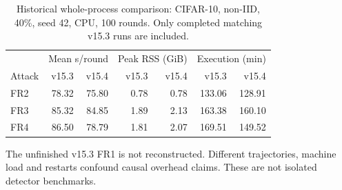 \begin{table}[t]\centering\footnotesize
\caption{Historical whole-process comparison: CIFAR-10, non-IID, 40\%, seed 42, CPU, 100 rounds. Only completed matching v15.3 runs are included.}\label{tab:historical-cost}
\begin{tabular}{lrrrrrr}\toprule
 & \multicolumn{2}{c}{Mean s/round} & \multicolumn{2}{c}{Peak RSS (GiB)} & \multicolumn{2}{c}{Execution (min)} \\
Attack & v15.3 & v15.4 & v15.3 & v15.4 & v15.3 & v15.4 \\ \midrule
FR2 & 78.32 & 75.80 & 0.78 & 0.78 & 133.06 & 128.91 \\
FR3 & 85.32 & 84.85 & 1.89 & 2.13 & 163.38 & 160.10 \\
FR4 & 86.50 & 78.79 & 1.81 & 2.07 & 169.51 & 149.52 \\
\bottomrule\end{tabular}
\par\smallskip\begin{minipage}{0.96\textwidth}\scriptsize The unfinished v15.3 FR1 is not reconstructed. Different trajectories, machine load and restarts confound causal overhead claims. These are not isolated detector benchmarks.\end{minipage}\end{table}
